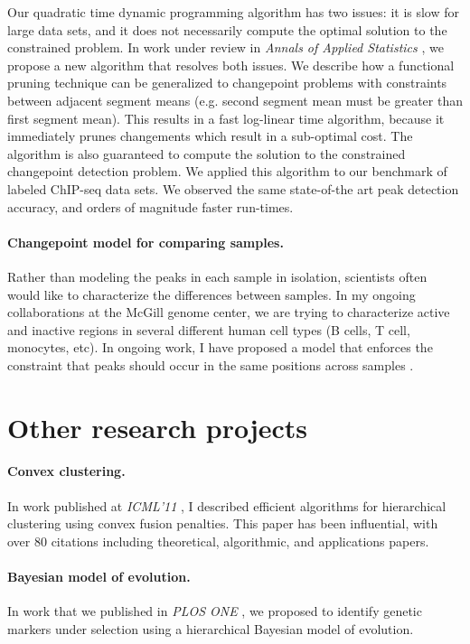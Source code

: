 \documentclass{article}
\begin{document}
Our quadratic time dynamic programming algorithm has two issues: it is
slow for large data sets, and it does not necessarily compute the
optimal solution to the constrained problem. In work under review in
\emph{Annals of Applied Statistics}
\citep{Hocking-constrained-changepoint-detection}, we propose a new
algorithm that resolves both issues. We describe how a functional
pruning technique can be generalized to changepoint problems with
constraints between adjacent segment means (e.g. second segment mean
must be greater than first segment mean). This results in a fast
log-linear time algorithm, because it immediately prunes changements
which result in a sub-optimal cost. The algorithm is also guaranteed
to compute the solution to the constrained changepoint detection
problem. We applied this algorithm to our benchmark of labeled
ChIP-seq data sets. We observed the same state-of-the art peak
detection accuracy, and orders of magnitude faster run-times.

\paragraph{Changepoint model for comparing samples.}
Rather than modeling the peaks in each sample in isolation, scientists
often would like to characterize the differences between samples. In
my ongoing collaborations at the McGill genome center, we are trying
to characterize active and inactive regions in several different human
cell types (B cells, T cell, monocytes, etc). In ongoing work, I have
proposed a model that enforces the constraint that peaks should occur
in the same positions across samples \citep{HOCKING-PeakSegJoint}.

\section{Other research projects}

\paragraph{Convex clustering.} In work published at \emph{ICML'11}
\citep{HOCKING-clusterpath}, I described efficient algorithms for
hierarchical clustering using convex fusion penalties. This paper has
been influential, with over 80 citations including theoretical,
algorithmic, and applications papers. 

\paragraph{Bayesian model of evolution.} In work that we published in
\emph{PLOS ONE} \citep{HOCKING-evolution}, we proposed to identify
genetic markers under selection using a hierarchical Bayesian model of
evolution.
\end{document}
